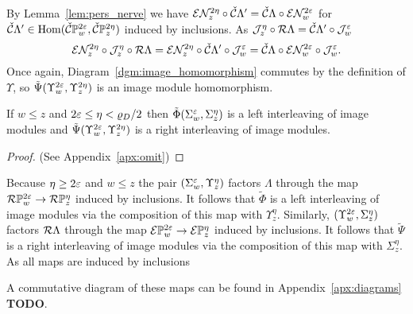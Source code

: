   By Lemma~\ref{lem:pers_nerve} we have $\mathcal{E}\mathcal{N}_z^{2\eta} \circ\check{\mathcal{C}}\Lambda'  = \check{\mathcal{C}} \Lambda\circ \mathcal{E}\mathcal{N}_w^{2\varepsilon}$ for $\check{\mathcal{C}}\Lambda'\in\mathrm{Hom}(\check{\mathcal{C}}\mathbb{P}_{w}^{2\varepsilon},\check{\mathcal{C}}\mathbb{P}_{z}^{2\eta})$ induced by inclusions.
  As $\mathcal{J}_z^\eta\circ \mathcal{R}\Lambda = \check{\mathcal{C}}\Lambda'\circ\mathcal{J}_w^\varepsilon$
  \[ \mathcal{E}\mathcal{N}_z^{2\eta}\circ \mathcal{J}_z^\eta\circ \mathcal{R}\Lambda = \mathcal{E}\mathcal{N}_z^{2\eta}\circ\check{\mathcal{C}}\Lambda'\circ\mathcal{J}_w^\varepsilon = \check{\mathcal{C}} \Lambda\circ \mathcal{E}\mathcal{N}_w^{2\varepsilon}\circ\mathcal{J}_w^\varepsilon.\]
  Once again, Diagram~\ref{dgm:image_homomorphism} commutes by the definition of $\Upsilon$, so $\tilde{\Psi}(\Upsilon_w^{2\varepsilon},\Upsilon_z^{2\eta})$ is an image module homomorphism.
\endproofatend


\begin{corollary}\label{cor:left_right}
  If $w\leq z$ and $2\varepsilon \leq \eta < \varrho_D / 2$ then $\tilde{\Phi}(\Sigma_w^\varepsilon,\Sigma_z^\eta)$ is a left interleaving of image modules and $\tilde{\Psi}(\Upsilon_w^{2\varepsilon},\Upsilon_z^{2\eta})$ is a right interleaving of image modules.
\end{corollary}\begin{proof}
  (See Appendix~\ref{apx:omit})
\end{proof}
\proofatend
  Because $\eta\geq 2\varepsilon$ and $w\leq z$ the pair $(\Sigma_w^\varepsilon, \Upsilon_z^\eta)$ factors $\Lambda$ through the map $\mathcal{R}\mathbb{P}_{w}^{2\varepsilon}\to \mathcal{R}\mathbb{P}_{z}^{\eta}$ induced by inclusions.
  It follows that $\tilde{\Phi}$ is a left interleaving of image modules via the composition of this map with $\Upsilon_z^\eta$.
  Similarly, $(\Upsilon_w^{2\varepsilon}, \Sigma_z^{\eta})$ factors $\mathcal{R}\Lambda$ through the map $\mathcal{E}\mathbb{P}_{w}^{2\varepsilon}\to \mathcal{E}\mathbb{P}_{z}^{\eta}$ induced by inclusions.
  It follows that $\tilde{\Psi}$ is a right interleaving of image modules via the composition of this map with $\Sigma_z^{\eta}$.
  As all maps are induced by inclusions
\endproofatend

A commutative diagram of these maps can be found in Appendix~\ref{apx:diagrams} \textbf{TODO}.
